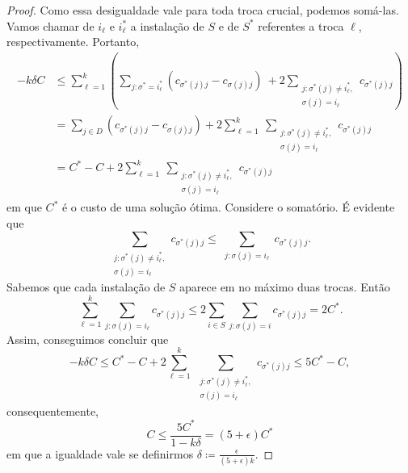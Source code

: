 \begin{proof}
Como essa desigualdade vale para toda troca crucial, podemos somá-las. Vamos chamar de $i_\ell$ e $i_\ell^*$ a instalação de $S$ e de $S^*$ referentes a troca $\ell$, respectivamente. Portanto,
\begin{subequations}
\begin{align*}
- k \delta C &\leq \sum_{\ell = 1}^k \left(  \sum_{j : \sigma^* = i_\ell^*} (c_{\sigma^*(j)j} - c_{\sigma(j)j}) \ + 2 \sum_{\substack{ j : \sigma^*(j)\neq i_\ell^*,\\  \sigma(j) = i_\ell}} c_{\sigma^*(j)j}     \right) \\
&= \sum_{j\in D} (c_{\sigma^*(j)j} - c_{\sigma(j)j}) + 2 \sum_{\ell = 1}^k \ \sum_{\substack{ j : \sigma^*(j)\neq i_\ell^*,\\  \sigma(j) = i_\ell}} c_{\sigma^*(j)j} \\
&= C^* - C + 2 \sum_{\ell = 1}^k \ \sum_{\substack{ j : \sigma^*(j)\neq i_\ell^*,\\  \sigma(j) = i_\ell}} c_{\sigma^*(j)j}
\end{align*}
\end{subequations}
em que $C^*$ é o custo de uma solução ótima. Considere o somatório. É evidente que 
\[\sum_{\substack{ j : \sigma^*(j)\neq i_\ell^*,\\  \sigma(j) = i_\ell}} c_{\sigma^*(j)j} \leq \sum_{\substack{j:\sigma(j) = i_\ell}} c_{\sigma^*(j)j}.\]
Sabemos que cada instalação de $S$ aparece em no máximo duas trocas. Então
\[ \sum_{\ell=1}^k \sum_{j: \sigma(j) = i_\ell} c_{\sigma^*(j)j} \leq 2\sum_{i \in S} \sum_{j: \sigma(j) = i} c_{\sigma^*(j)j} = 2 C^*.\]
Assim, conseguimos concluir que 
\[ - k \delta C \leq C^* - C + 2 \sum_{\ell = 1}^k \ \sum_{\substack{ j : \sigma^*(j)\neq i_\ell^*,\\  \sigma(j) = i_\ell}} c_{\sigma^*(j)j} \leq 5C^* - C,\]
consequentemente, 
\[C \leq \frac{5C^*}{1 - k\delta} = (5+\epsilon)C^*\]
em que a igualdade vale se definirmos $\delta \coloneqq \frac{\epsilon}{(5+\epsilon)k}$.
\end{proof}